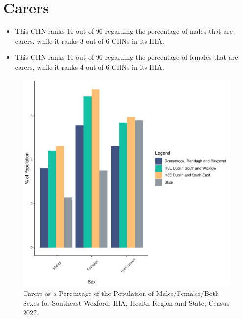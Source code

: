 \documentclass{article}
\begin{document}
\section{Carers}\label{sect:Carers}
\begin{itemize}
\item This CHN ranks  10 out of 96 regarding the percentage of males that are carers, while it ranks   3 out of 6 CHNs in its IHA.
\item This CHN ranks  10 out of 96 regarding the percentage of females that are carers, while it ranks   4 out of 6 CHNs in its IHA.
\end{itemize}
\begin{figure}[H]
	\centering
	\includegraphics[width = 150mm]{../figures/CareED.pdf}
	\caption{Carers as a Percentage of the Population of Males/Females/Both Sexes for Southeast Wexford; IHA, Health Region and State; Census 2022.}
	\label{fig:2ae19629-1a6a-13a3-e055-000000000001}
	\end{figure}
\end{document}
